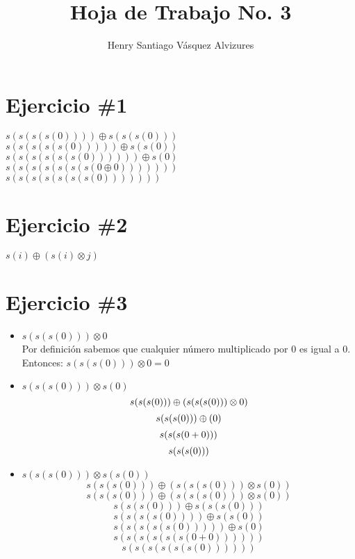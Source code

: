 \documentclass[12pt,letterpaper]{article}
\author{Henry Santiago Vásquez Alvizures}
\title{Hoja de Trabajo No. 3}
\begin{document}
\maketitle 
\section{Ejercicio \#1}
\begin{flushleft}
	$ s(s(s(s(0))))  \oplus s(s(s(0))) $\\
	$ s(s(s(s(s(0)))))  \oplus s(s(0)) $\\
	$ s(s(s(s(s(s(0))))))  \oplus s(0) $\\
	$ s(s(s(s(s(s(s(0 \oplus 0)))))))  $\\
	$ s(s(s(s(s(s(s(0)))))))  $\\
\end{flushleft}
\section{Ejercicio \#2}
\begin{flushleft}
	$ s(i) \oplus (s(i) \otimes j) $\\
\end{flushleft}
\section{Ejercicio \#3}
\begin{itemize}
	\item{$s(s(s(0)))\otimes 0$}\\
	Por definición sabemos que cualquier número multiplicado por 0 es igual a 0.\\
	Entonces: $s(s(s(0)))\otimes 0 = 0$
	
	\item{$s(s(s(0)))\otimes s(0)$}
	\[
		s(s(s(0))) \oplus (s(s(s(0))) \otimes 0)\\	
	\]
	\[
		s(s(s(0))) \oplus (0)\\	
	\]
	\[
		s(s(s(0+0)))\\	
	\]
	\[
		s(s(s(0)))\\	
	\]
	
	\item{$s(s(s(0))) \otimes s(s(0))$}	
	\[
		s(s(s(0))) \oplus (s(s(s(0))) \otimes s(0))
	\]
	\[
		s(s(s(0))) \oplus (s(s(s(0))) \otimes s(0))
	\]
	\[
		s(s(s(0))) \oplus s(s(s(0)))
	\]
	\[
		s(s(s(s(0)))) \oplus s(s(0))
	\]
	\[
		s(s(s(s(s(0))))) \oplus s(0)
	\]
	\[
		s(s(s(s(s(s(0 + 0)))))) 
	\]
	\[
		s(s(s(s(s(s(0)))))) 
	\]
	
\end{itemize}
\end{document}
